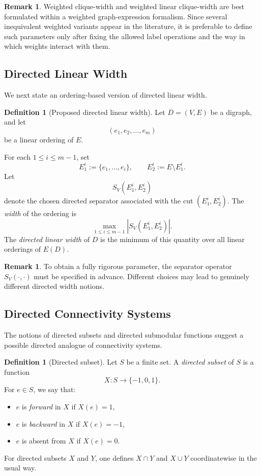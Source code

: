 \documentclass[10pt]{book}
\theoremstyle{definition}
\newtheorem{remark}[theorem]{Remark}
\newtheorem{definition}[theorem]{Definition}
\begin{document}
\begin{remark}
Weighted clique-width and weighted linear clique-width are best formulated within a weighted graph-expression formalism.
Since several inequivalent weighted variants appear in the literature, it is preferable to define such parameters only after fixing the allowed label operations and the way in which weights interact with them.
\end{remark}

\subsection{Directed Linear Width}

We next state an ordering-based version of directed linear width.

\begin{definition}[Proposed directed linear width]
Let \(D=(V,E)\) be a digraph, and let
\[
(e_1,e_2,\dots,e_m)
\]
be a linear ordering of \(E\).

For each \(1\le i\le m-1\), set
\[
E_1^i:=\{e_1,\dots,e_i\},
\qquad
E_2^i:=E\setminus E_1^i.
\]
Let
\[
S_V(E_1^i,E_2^i)
\]
denote the chosen directed separator associated with the cut \((E_1^i,E_2^i)\).
The \emph{width} of the ordering is
\[
\max_{1\le i\le m-1} |S_V(E_1^i,E_2^i)|.
\]
The \emph{directed linear width} of \(D\) is the minimum of this quantity over all linear orderings of \(E(D)\).
\end{definition}

\begin{remark}
To obtain a fully rigorous parameter, the separator operator \(S_V(\cdot,\cdot)\) must be specified in advance.
Different choices may lead to genuinely different directed width notions.
\end{remark}

\subsection{Directed Connectivity Systems}

The notions of directed subsets and directed submodular functions suggest a possible directed analogue of connectivity systems.

\begin{definition}[Directed subset]\cite{Qi1988DirectedSD}
Let \(S\) be a finite set.
A \emph{directed subset} of \(S\) is a function
\[
X:S\to\{-1,0,1\}.
\]
For \(e\in S\), we say that:
\begin{itemize}
    \item \(e\) is \emph{forward} in \(X\) if \(X(e)=1\),
    \item \(e\) is \emph{backward} in \(X\) if \(X(e)=-1\),
    \item \(e\) is absent from \(X\) if \(X(e)=0\).
\end{itemize}
For directed subsets \(X\) and \(Y\), one defines \(X\cap Y\) and \(X\cup Y\) coordinatewise in the usual way.
\end{definition}
\end{document}
